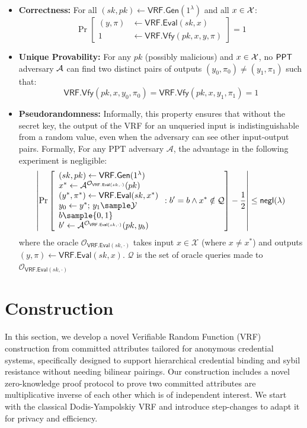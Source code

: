 \begin{itemize}
    \item \textbf{Correctness:} For all $(sk, pk) \gets \mathsf{VRF.Gen}(1^\lambda)$ and all $x \in \mathcal{X}$:
    \[
    \Pr\left[\begin{aligned}
        (y, \pi) &\gets \mathsf{VRF.Eval}(sk, x) \\
        1 &\gets \mathsf{VRF.Vfy}(pk, x, y, \pi)
    \end{aligned}\right] = 1
    \]

    \item \textbf{Unique Provability:} For any $pk$ (possibly malicious) and $x \in \mathcal{X}$, no $\mathsf{PPT}$ adversary $\mathcal{A}$ can find two distinct pairs of outputs $(y_0, \pi_0) \neq (y_1, \pi_1)$ such that:
    \[
    \mathsf{VRF.Vfy}(pk, x, y_0, \pi_0) = \mathsf{VRF.Vfy}(pk, x, y_1, \pi_1) = 1
    \]

    \item \textbf{Pseudorandomness:} Informally, this property ensures that without the secret key, the output of the VRF for an unqueried input is indistinguishable from a random value, even when the adversary can see other input-output pairs.
    Formally, For any PPT adversary $\mathcal{A}$, the advantage in the following experiment is negligible:
    \[
    \left|\Pr\left[\begin{array}{l}
        (sk, pk) \gets \mathsf{VRF.Gen}(1^\lambda) \\
        x^* \gets \mathcal{A}^{\mathcal{O}_{\mathsf{VRF.Eval}(sk, \cdot)}}(pk) \\
        (y^*, \pi^*) \gets \mathsf{VRF.Eval}(sk, x^*) \\
        y_0 \gets y^*; \, y_1 \sample \mathcal{Y} \\
        b \sample \{0,1\} \\
        b' \gets \mathcal{A}^{\mathcal{O}_{\mathsf{VRF.Eval}(sk, \cdot)}}(pk, y_b)
    \end{array} : b' = b \wedge x^* \notin \mathcal{Q}\right] - \frac{1}{2}\right| \leq \negl(\lambda)
    \]
    where the oracle $\mathcal{O}_{\mathsf{VRF.Eval}(sk, \cdot)}$ takes input $x \in \mathcal{X}$ (where $x \neq x^*$) and outputs $(y, \pi) \gets \mathsf{VRF.Eval}(sk, x)$. $\mathcal{Q}$ is the set of oracle queries made to $\mathcal{O}_{\mathsf{VRF.Eval}(sk, \cdot)}$  
\end{itemize}





\section{Construction}
In this section, we develop a novel Verifiable Random Function (VRF) construction from committed attributes tailored for anonymous credential systems, specifically designed to support hierarchical credential binding and sybil resistance without needing bilinear pairings. Our construction includes a novel zero-knowledge proof protocol to prove two committed attributes are multiplicative inverse of each other which is of independent interest. 
We start with the classical Dodis-Yampolskiy VRF \cite{hutchison_verifiable_2005} and introduce step-changes to adapt it for privacy and efficiency. 


